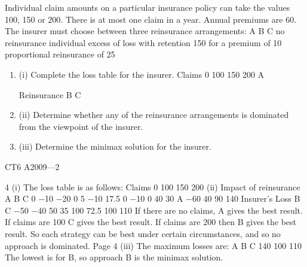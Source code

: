Individual claim amounts on a particular insurance policy can take the values 100, 150 or 200.
There is at most one claim in a year. Annual premiums are 60.
The insurer must choose between three reinsurance arrangements:
A
B
C no reinsurance
individual excess of loss with retention 150 for a premium of 10
proportional reinsurance of 25%
\begin{enumerate}
\item (i)  Complete the loss table for the insurer.
Claims
0
100
150
200
A

Reinsurance
B
C
\item (ii)  Determine whether any of the reinsurance arrangements is dominated from the
viewpoint of the insurer.

\item (iii)  Determine the minimax solution for the insurer.
\end{enumerate}

CT6 A2009—2


4
(i)
The loss table is as follows:
Claims
0
100
150
200
(ii)
Impact of reinsurance
A
B
C
0
−10
−20
0
5
−10
17.5
0
−10
0
40
30
A
−60
40
90
140
Insurer’s Loss
B
C
−50
−40
50
35
100
72.5
100
110
If there are no claims, A gives the best result.
If claims are 100 C gives the best result.
If claims are 200 then B gives the best result.
So each strategy can be best under certain circumstances, and so no approach
is dominated.
Page 4%
(iii)
The maximum losses are:
A
B
C
140
100
110
The lowest is for B, so approach B is the minimax solution.
